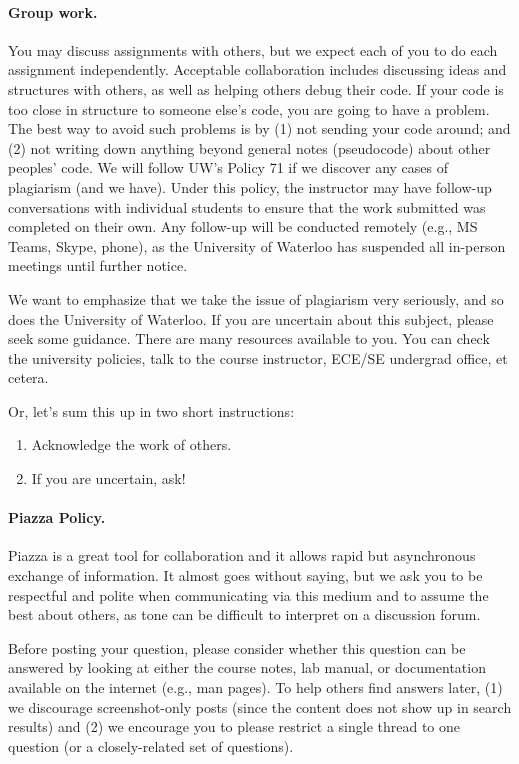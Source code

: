 \documentclass[letterpaper,10pt]{article}
\begin{document}
\paragraph{Group work.} 
You may discuss assignments with others, but we expect each of you to
do each assignment independently. Acceptable collaboration includes
discussing ideas and structures with others, as well as helping others
debug their code. If your code is too close in structure to someone
else's code, you are going to have a problem. The best way to avoid
such problems is by (1) not sending your code around; and (2) not
writing down anything beyond general notes (pseudocode) about other
peoples' code. We will follow UW's Policy 71 if we discover any cases of
plagiarism (and we have). Under this policy, the instructor may have follow-up conversations with individual students to ensure that the work submitted was completed on their own. Any follow-up will be conducted remotely (e.g., MS Teams, Skype, phone), as the University of Waterloo has suspended all in-person meetings until further notice.

We want to emphasize that we take the issue of plagiarism very seriously, and so does the University of Waterloo. If you are uncertain about this subject, please seek some guidance. There are many resources available to you. You can check the university policies, talk to the course instructor, ECE/SE undergrad office, et cetera.

Or, let's sum this up in two short instructions:
\begin{enumerate}
	\item Acknowledge the work of others. 
	\item If you are uncertain, ask!
\end{enumerate}

\paragraph{Piazza Policy.}
Piazza is a great tool for collaboration and it allows rapid but asynchronous exchange of information. It almost goes without saying, but we ask you to be respectful and polite when communicating via this medium and to assume the best about others, as tone can be difficult to interpret on a discussion forum. 

Before posting your question, please consider whether this question can be answered by looking at either the course notes, lab manual, or documentation available on the internet (e.g., man pages). To help others find answers later, (1) we discourage screenshot-only posts (since the content does not show up in search results) and (2) we encourage you to please restrict a single thread to one question (or a closely-related set of questions).
\end{document}
